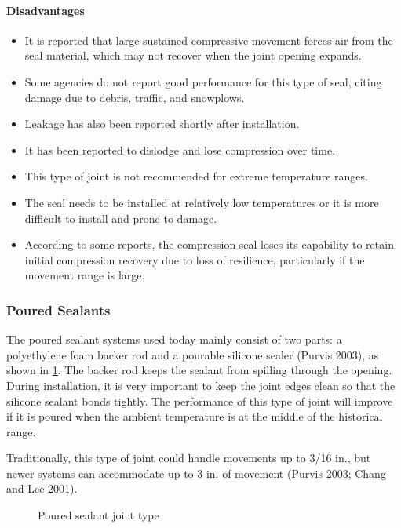 \paragraph{Disadvantages}
\begin{itemize}
  \item It is reported that large sustained compressive movement forces air from the seal material, which may not
  recover when the joint opening expands.
  \item Some agencies do not report good performance for this type of seal, citing damage due to debris, traffic, and
  snowplows.
  \item Leakage has also been reported shortly after installation.
  \item It has been reported to dislodge and lose compression over time.
  \item This type of joint is not recommended for extreme temperature ranges.
  \item The seal needs to be installed at relatively low temperatures or it is more difficult to install and prone to
  damage.
  \item According to some reports, the compression seal loses its capability to retain initial compression recovery
  due to loss of resilience, particularly if the movement range is large.
\end{itemize}

\subsubsection{Poured Sealants}
The poured sealant systems used today mainly consist of two parts: a polyethylene foam backer rod and a
pourable silicone sealer (Purvis 2003), as shown in \cref{fig:poured-sealant-joint-type}. The backer rod keeps the sealant from spilling
through the opening. During installation, it is very important to keep the joint edges clean so that the silicone sealant
bonds tightly. The performance of this type of joint will improve if it is poured when the ambient temperature is at
the middle of the historical range.

Traditionally, this type of joint could handle movements up to 3/16 in., but newer systems can accommodate up
to 3 in. of movement (Purvis 2003; Chang and Lee 2001).

\begin{figure}
  \caption{Poured sealant joint type}
  \label{fig:poured-sealant-joint-type}
\end{figure}

